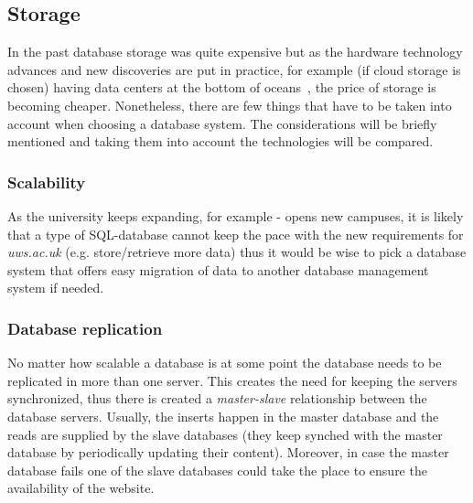 \documentclass[11]{article}
\begin{document}




	\subsection{Storage}
		In the past database storage was quite expensive but as the hardware technology advances and new discoveries are put in practice, for example (if cloud storage is chosen) having data centers at the bottom of oceans~\citep{simon2018project}, the price of storage is becoming cheaper. Nonetheless, there are few things that have to be taken into account when choosing a database system. The considerations will be briefly mentioned and taking them into account the technologies will be compared.

	\subsubsection{Scalability\\}
	As the university keeps expanding, for example - opens new campuses, it is likely that a type of SQL-database cannot keep the pace with the new requirements for \textit{uws.ac.uk} (e.g. store/retrieve more data) thus it would be wise to pick a database system that offers  easy migration of data to another database management system if needed.

	\subsubsection{Database replication\\}
	No matter how scalable a database is at some point the database needs to be replicated in more than one server. This creates the need for keeping the servers synchronized, thus there is created a \textit{master-slave} relationship between the database servers. Usually, the inserts happen in the master database and the reads are supplied by the slave databases (they keep synched with the master database by periodically updating their content). Moreover, in case the master database fails one of the slave databases could take the place to ensure the availability of the website.
\end{document}
